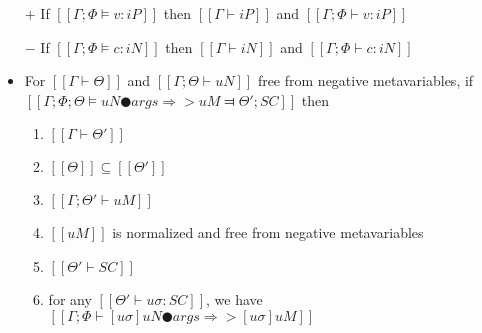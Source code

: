 \begin{lemma} \label{lemma:typing-soundness}
    \hfill
    \begin{itemize}
        \item [$+$] If $[[Γ; Φ ⊨ v : iP]]$ then $[[Γ ⊢ iP]]$ and $[[Γ; Φ ⊢ v : iP]]$
        \item [$-$] If $[[Γ; Φ ⊨ c : iN]]$ then $[[Γ ⊢ iN]]$ and $[[Γ; Φ ⊢ c : iN]]$
        \item  For $[[Γ ⊢ Θ]]$ and $[[Γ; Θ ⊢ uN]]$ free from negative metavariables,
        if $[[Γ; Φ; Θ ⊨ uN ● args ⇒> uM ⫤ Θ'; SC]]$ then
        \begin{enumerate}
            \item $[[Γ ⊢ Θ']]$
            \item $[[Θ]] \subseteq [[Θ']]$
            \item $[[Γ; Θ' ⊢ uM]]$
            \item $[[uM]]$ is normalized and free from negative metavariables
            \item $[[Θ' ⊢ SC]]$
            \item for any $[[Θ' ⊢ uσ : SC]]$, we have $[[ Γ ; Φ ⊢ [uσ]uN ● args ⇒> [uσ]uM ]]$
        \end{enumerate}
    \end{itemize}
\end{lemma}
